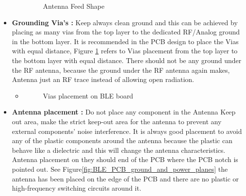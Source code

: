 \begin{itemize}
\begin{itemize}
\begin{figure}[h]
					\caption{Antenna Feed Shape}
					\centering
					\label{fig:Antenna_Feed_Shape}
				\end{figure}
			\end{itemize}
	\item \textbf{Grounding Via's :} Keep always clean ground and this can be achieved by placing as many vias from the top layer to the dedicated RF/Analog ground in the bottom layer. It is recommended in the PCB design to place the Vias with equal distance, Figure \ref{fig:Antenna_Feed_Shape} refers to Vias placement from the top layer to the bottom layer with equal distance. There should not be any ground under the RF antenna, because the ground under the RF antenna again makes, Antenna just an RF trace instead of allowing open radiation.
	\begin{itemize}
		\item 
		\begin{figure}[h]
			\centering
			\qquad
			\caption{Vias placement on BLE board}
			\centering
			\label{fig:BLE_Module_Vias_Placement}
		\end{figure}
	\end{itemize} 
	\item \textbf{Antenna placement :} Do not place any component in the Antenna Keep out area, make the strict keep-out area for the antenna to prevent any external components' noise interference. It is always good placement to avoid any of the plastic components around the antenna because the plastic can behave like a dielectric and this will change the antenna characteristics. Antenna placement on they should end of the PCB where the PCB notch is pointed out. See Figure\ref{fig:BLE_PCB_ground_and_power_planes} the antenna has been placed on the edge of the PCB and there are no plastic or high-frequency switching circuits around it.
\end{itemize}

